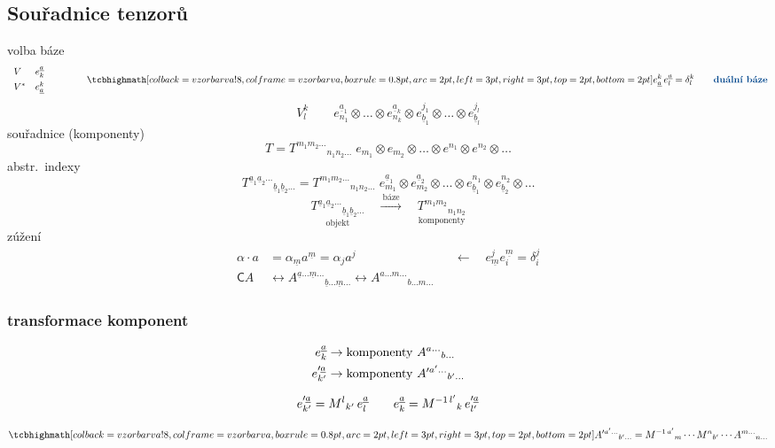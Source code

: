 \subsection{Souřadnice tenzorů}

volba báze
\[
  \begin{array}{ll}
    V & e_k^{\gmIpa} \\[4pt]
    V^* & e^k_{\gmIpa}
  \end{array}
  \qquad\qquad
  \vzorec{e^k_{\gmIpa}\,e_l^{\gmIpa} = \delta^k_l} \qquad\text{\kw{duální báze}}
\]
\[
  V^k_l \qquad e^{\underline{a}_1}_{n_1}\otimes\dots\otimes e^{\underline{a}_k}_{n_k}\otimes e^{j_1}_{\underline{b}_1}\otimes\dots\otimes e^{j_l}_{\underline{b}_l}
\]
souřadnice (komponenty)
\[
  T = T^{m_1m_2\dots}{}_{n_1n_2\dots}\; e_{m_1}\otimes e_{m_2}\otimes\dots\otimes e^{n_1}\otimes e^{n_2}\otimes\dots
\]
\quad abstr.\ indexy
\[
  T^{\underline{a}_1\underline{a}_2\dots}{}_{\underline{b}_1\underline{b}_2\dots}
  = T^{m_1m_2\dots}{}_{n_1n_2\dots}\; e^{\underline{a}_1}_{m_1}\otimes e^{\underline{a}_2}_{m_2}\otimes\dots\otimes e^{n_1}_{\underline{b}_1}\otimes e^{n_2}_{\underline{b}_2}\otimes\dots
\]
\[
  \underset{\text{objekt}}{T^{\underline{a}_1\underline{a}_2\dots}{}_{\underline{b}_1\underline{b}_2\dots}}
  \quad\xrightarrow{\ \text{báze}\ }\quad
  \underset{\text{komponenty}}{T^{m_1m_2}{}_{n_1n_2}}
\]
zúžení
\[
  \begin{aligned}
    \alpha\cdot a &= \alpha_{\underline{m}}a^{\underline{m}} = \alpha_j a^j
      &&\leftarrow\quad e^j_{\underline{m}}e^{\underline{m}}_i = \delta^j_i \\
    \mathsf{C}A &\leftrightarrow A^{\underline{a}\dots\underline{m}\dots}{}_{\underline{b}\dots\underline{m}\dots}
      \leftrightarrow A^{a\dots m\dots}{}_{b\dots m\dots}
  \end{aligned}
\]

\subsubsection*{transformace komponent}
\begin{minipage}{0.5\textwidth}
\[
  \begin{aligned}
    e^{\underline{a}}_k &\to \text{komponenty } A^{a\dots}{}_{b\dots} \\
    e'^{\underline{a}}_{k'} &\to \text{komponenty } A'^{a'\dots}{}_{b'\dots}
  \end{aligned}
\]
\end{minipage}
\begin{minipage}{0.48\textwidth}
\[
  e'^{\underline{a}}_{k'} = M^l{}_{k'}\,e^{\underline{a}}_l \qquad e^{\underline{a}}_k = M^{-1\,l'}{}_k\,e'^{\underline{a}}_{l'}
\]
\end{minipage}
\[
  \vzorec{A'^{a'\dots}{}_{b'\dots} = M^{-1\,a'}{}_m\cdots M^n{}_{b'}\cdots A^{m\dots}{}_{n\dots}}
\]


